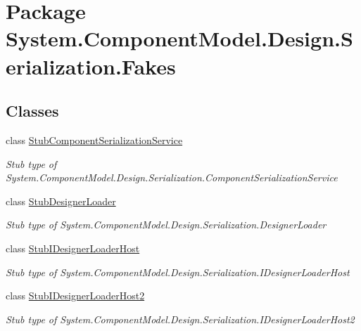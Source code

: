 \hypertarget{namespace_system_1_1_component_model_1_1_design_1_1_serialization_1_1_fakes}{\section{Package System.\-Component\-Model.\-Design.\-Serialization.\-Fakes}
\label{namespace_system_1_1_component_model_1_1_design_1_1_serialization_1_1_fakes}
}
\subsection*{Classes}
\begin{DoxyCompactItemize}
\item 
class \hyperlink{class_system_1_1_component_model_1_1_design_1_1_serialization_1_1_fakes_1_1_stub_component_serialization_service}{Stub\-Component\-Serialization\-Service}
\begin{DoxyCompactList}\small\item\em Stub type of System.\-Component\-Model.\-Design.\-Serialization.\-Component\-Serialization\-Service\end{DoxyCompactList}\item 
class \hyperlink{class_system_1_1_component_model_1_1_design_1_1_serialization_1_1_fakes_1_1_stub_designer_loader}{Stub\-Designer\-Loader}
\begin{DoxyCompactList}\small\item\em Stub type of System.\-Component\-Model.\-Design.\-Serialization.\-Designer\-Loader\end{DoxyCompactList}\item 
class \hyperlink{class_system_1_1_component_model_1_1_design_1_1_serialization_1_1_fakes_1_1_stub_i_designer_loader_host}{Stub\-I\-Designer\-Loader\-Host}
\begin{DoxyCompactList}\small\item\em Stub type of System.\-Component\-Model.\-Design.\-Serialization.\-I\-Designer\-Loader\-Host\end{DoxyCompactList}\item 
class \hyperlink{class_system_1_1_component_model_1_1_design_1_1_serialization_1_1_fakes_1_1_stub_i_designer_loader_host2}{Stub\-I\-Designer\-Loader\-Host2}
\begin{DoxyCompactList}\small\item\em Stub type of System.\-Component\-Model.\-Design.\-Serialization.\-I\-Designer\-Loader\-Host2\end{DoxyCompactList}\item 

\end{DoxyCompactItemize}
